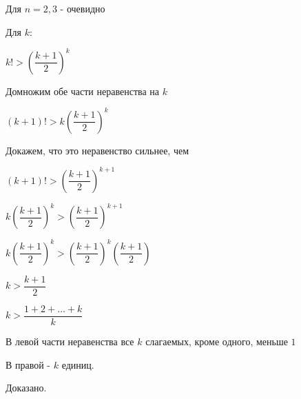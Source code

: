 Для $ n = 2,3 $ - очевидно

Для $ k $: 

$ k! >  \left( \dfrac{k+1}{2} \right)^{k} $

Домножим обе части неравенства на $ k $

$ (k+1)! >  k \left( \dfrac{k+1}{2} \right)^{k} $

Докажем, что это неравенство сильнее, чем

$ (k+1)! >  \left( \dfrac{k+1}{2} \right)^{k+1} $

$ k \left( \dfrac{k+1}{2} \right)^{k} >  \left( \dfrac{k+1}{2} \right)^{k+1} $

$ k \left( \dfrac{k+1}{2} \right)^{k} >  \left( \dfrac{k+1}{2} \right)^{k} \left( \dfrac{k+1}{2} \right) $

$ k > \dfrac{k+1}{2} $

$ k > \dfrac{1+2+ \ldots +k}{k} $

В левой части неравенства все $ k $ слагаемых, кроме одного, меньше $ 1 $

В правой - $ k $ единиц.

Доказано.